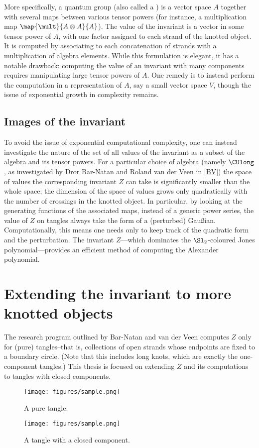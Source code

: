 More specifically, a quantum group (also called a ) is a
vector space $A$ together with several maps between various tensor powers (for
instance, a multiplication map $\map {\mult} {A \otimes A} {A}$). The value of
the invariant is a vector in some tensor power of $A$, with one factor assigned
to each strand of the knotted object. It is computed by associating to each
concatenation of strands with a multiplication of algebra elements. While this
formulation is elegant, it has a notable drawback: computing the value of an
invariant with many components requires manipulating large tensor powers of $A$.
One remedy is to instead perform the computation in a representation of $A$, say
a small vector space $V$, though the issue of exponential growth in complexity
remains.

\subsection{Images of the invariant}
To avoid the issue of exponential computational complexity, one can instead
investigate the nature of the set of all values of the invariant as a subset of
the algebra and its tensor powers. For a particular choice of algebra (namely
$\CUlong$, as investigated by Dror Bar-Natan and Roland van der Veen in
\cref{BV}) the space of values the corresponding invariant $Z$ can take is
significantly smaller than the whole space; the dimension of the space of values
grows only quadratically with the number of crossings in the knotted object. In
particular, by looking at the generating functions of the associated maps,
instead of a generic power series, the value of $Z$ on tangles always take the
form of a (perturbed) Gaußian. Computationally, this means one needs only to
keep track of the quadratic form and the perturbation. The invariant $Z$---which
dominates the $\Sl_2$-coloured Jones polynomial---provides an efficient method
of computing the Alexander polynomial.

\section{Extending the invariant to more knotted objects}
The research program outlined by Bar-Natan and van der Veen computes $Z$
only for (pure) tangles--that is, collections of open strands whose endpoints
are fixed to a boundary circle. (Note that this includes long knots, which are
exactly the one-component tangles.) This thesis is focused on extending $Z$ and
its computations to tangles with closed components.
\begin{figure}[h]
        \centering
        \texttt{[image: figures/sample.png]}%
        \caption{A pure tangle.}
        \label{fig:pure_tangle}
\end{figure}
\begin{figure}[h]
        \centering
        \texttt{[image: figures/sample.png]}%
        \caption{A tangle with a closed component.}
        \label{fig:impure_tangle}
\end{figure}        

